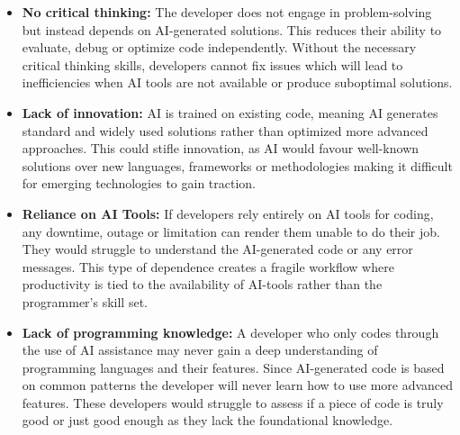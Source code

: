 \documentclass{article}
\begin{document}
\begin{itemize}
    \item \textbf{No critical thinking:} The developer does not engage in problem-solving but instead depends on AI-generated solutions. This reduces their ability to evaluate, debug or optimize code independently. Without the necessary critical thinking skills, developers cannot fix issues which will lead to inefficiencies when AI tools are not available or produce suboptimal solutions.
\end{itemize}
\begin{itemize}
    \item \textbf{Lack of innovation:} AI is trained on existing code, meaning AI generates standard and widely used solutions rather than optimized more advanced approaches. This could stifle innovation, as AI would favour well-known solutions over new languages, frameworks or methodologies making it difficult for emerging technologies to gain traction.
\end{itemize}
\begin{itemize}
    \item \textbf{Reliance on AI Tools:} If developers rely entirely on AI tools for coding, any downtime,  outage or limitation can render them unable to do their job. They would struggle to understand the AI-generated code or any error messages. This type of dependence creates a fragile workflow where productivity is tied to the availability of  AI-tools rather than the programmer’s skill set. 
\end{itemize}
\begin{itemize}
    \item \textbf{Lack of programming knowledge:} A developer who only codes through the use of AI assistance may never gain a deep understanding of programming languages and their features. Since AI-generated code is based on common patterns the developer will never learn how to use more advanced features. These developers would struggle to assess if a piece of code is truly good or just good enough as they lack the foundational knowledge.
\end{itemize}



\end{document}
